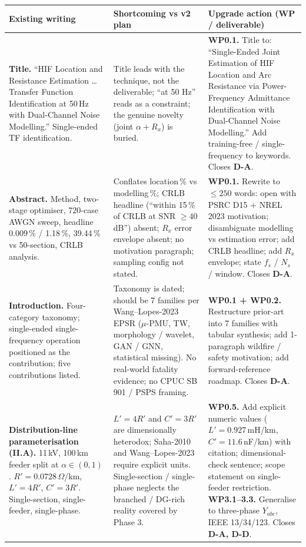 \documentclass[11pt,a4paper]{article}
\begin{document}
\renewcommand{\arraystretch}{1.18}
\begin{longtable}{L{4.4cm}L{4.6cm}L{6.0cm}}
\toprule
{}
\textbf{Existing writing} & \textbf{Shortcoming vs v2 plan} & \textbf{Upgrade action (WP / deliverable)}\\
\midrule
\endhead

\textbf{Title.}
``HIF Location and Resistance Estimation \ldots Transfer Function
Identification at 50\,Hz with Dual-Channel Noise Modelling.'' Single-ended TF
identification.
&
Title leads with the technique, not the deliverable; ``at 50 Hz'' reads as
a constraint; the genuine novelty (joint $\alpha + R_x$) is buried.
&
\textbf{WP0.1.} Title to: ``Single-Ended Joint Estimation of HIF Location
and Arc Resistance via Power-Frequency Admittance Identification with
Dual-Channel Noise Modelling.'' Add training-free / single-frequency to
keywords.  Closes \textbf{D-A}.\\

\textbf{Abstract.}
Method, two-stage optimiser, 720-case AWGN sweep, headline 0.009\,\% /
1.18\,\%, 39.44\,\% vs 50-section, CRLB analysis.
&
Conflates location\,\% vs modelling\,\%; CRLB headline
(``within 15\,\% of CRLB at SNR $\geq 40$\,dB'') absent;
$R_x$ error envelope absent; no motivation paragraph; sampling
config not stated.
&
\textbf{WP0.1.} Rewrite to $\leq 250$ words: open with PSRC D15 + NREL 2023
motivation; disambiguate modelling vs estimation error; add CRLB headline;
add $R_x$ envelope; state $f_s$ / $N_s$ / window.  Closes \textbf{D-A}.\\

\textbf{Introduction.}
Four-category taxonomy; single-ended single-frequency operation positioned
as the contribution; five contributions listed.
&
Taxonomy is dated; should be 7 families per Wang--Lopes-2023 EPSR
($\mu$-PMU, TW, morphology / wavelet, GAN / GNN, statistical missing).
No real-world fatality evidence; no CPUC SB 901 / PSPS framing.
&
\textbf{WP0.1 + WP0.2.} Restructure prior-art into 7 families with tabular
synthesis; add 1-paragraph wildfire / safety motivation; add
forward-reference roadmap.  Closes \textbf{D-A}.\\

\textbf{Distribution-line parameterisation (II.A).}
11\,kV, 100\,km feeder split at $\alpha\in(0,1)$.  $R'=0.0728$\,$\Omega$/km,
$L'=4R'$, $C'=3R'$.  Single-section, single-feeder, single-phase.
&
$L'=4R'$ and $C'=3R'$ are dimensionally heterodox; Saha-2010 and
Wang--Lopes-2023 require explicit units.  Single-section / single-phase
neglects the branched / DG-rich reality covered by Phase 3.
&
\textbf{WP0.5.} Add explicit numeric values
($L'=0.927$\,mH/km, $C'=11.6$\,nF/km) with citation; dimensional-check
sentence; scope statement on single-feeder restriction.
\textbf{WP3.1--3.3.} Generalise to three-phase $Y_{abc}$, IEEE 13/34/123.
Closes \textbf{D-A, D-D}.\\


\end{longtable}
\end{document}
